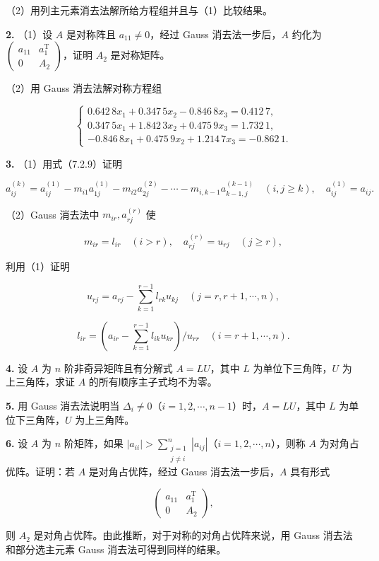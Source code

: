 \documentclass[
  10pt,
  fontset=fandol]{ctexart}
\begin{document}
（2）用列主元素消去法解所给方程组并且与（1）比较结果。

\textbf{2.} （1）设 \(A\) 是对称阵且 \(a_{11}\neq0\)，经过 Gauss 消去法一步后，\(A\) 约化为 \(\begin{pmatrix}a_{11}&a_1^{\mathrm T}\\0&A_2\end{pmatrix}\)，证明 \(A_2\) 是对称矩阵。

（2）用 Gauss 消去法解对称方程组

\[
\begin{cases}
0.642\,8x_1+0.347\,5x_2-0.846\,8x_3=0.412\,7,\\
0.347\,5x_1+1.842\,3x_2+0.475\,9x_3=1.732\,1,\\
-0.846\,8x_1+0.475\,9x_2+1.214\,7x_3=-0.862\,1.
\end{cases}
\]

\textbf{3.} （1）用式（7.2.9）证明

\[
a_{ij}^{(k)}=a_{ij}^{(1)}-m_{i1}a_{1j}^{(1)}-m_{i2}a_{2j}^{(2)}-\cdots-m_{i,k-1}a_{k-1,j}^{(k-1)}
\quad(i,j\geqslant k),\quad a_{ij}^{(1)}=a_{ij}.
\]

（2）Gauss 消去法中 \(m_{ir},a_{rj}^{(r)}\) 使

\[
m_{ir}=l_{ir}\quad(i>r),\quad a_{rj}^{(r)}=u_{rj}\quad(j\geqslant r),
\]

利用（1）证明

\[
u_{rj}=a_{rj}-\sum_{k=1}^{r-1}l_{rk}u_{kj}\quad(j=r,r+1,\cdots,n),
\]

\[
l_{ir}=\left(a_{ir}-\sum_{k=1}^{r-1}l_{ik}u_{kr}\right)/u_{rr}\quad(i=r+1,\cdots,n).
\]

\textbf{4.} 设 \(A\) 为 \(n\) 阶非奇异矩阵且有分解式 \(A=LU\)，其中 \(L\) 为单位下三角阵，\(U\) 为上三角阵，求证 \(A\) 的所有顺序主子式均不为零。

\textbf{5.} 用 Gauss 消去法说明当 \(\Delta_i\neq0\)（\(i=1,2,\cdots,n-1\)）时，\(A=LU\)，其中 \(L\) 为单位下三角阵，\(U\) 为上三角阵。

\textbf{6.} 设 \(A\) 为 \(n\) 阶矩阵，如果 \(|a_{ii}|>\sum_{\substack{j=1\\j\neq i}}^{n}|a_{ij}|\)（\(i=1,2,\cdots,n\)），则称 \(A\) 为对角占优阵。证明：若 \(A\) 是对角占优阵，经过 Gauss 消去法一步后，\(A\) 具有形式

\[
\begin{pmatrix}a_{11}&a_1^{\mathrm T}\\0&A_2\end{pmatrix},
\]

则 \(A_2\) 是对角占优阵。由此推断，对于对称的对角占优阵来说，用 Gauss 消去法和部分选主元素 Gauss 消去法可得到同样的结果。
\end{document}
